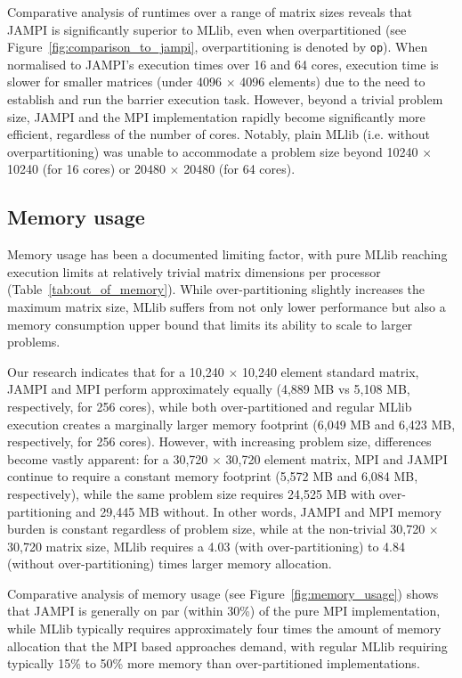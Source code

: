 \documentclass[fleqn,10pt]{SelfArx} %
\begin{document}
Comparative analysis of runtimes over a range of matrix sizes reveals that JAMPI is significantly superior to MLlib, even when overpartitioned (see Figure~\ref{fig:comparison_to_jampi}, overpartitioning is denoted by \texttt{op}). When normalised to JAMPI's execution times over 16 and 64 cores, execution time is slower for smaller matrices (under 4096 $\times$ 4096 elements) due to the need to establish and run the barrier execution task. However, beyond a trivial problem size, JAMPI and the MPI implementation rapidly become significantly more efficient, regardless of the number of cores. Notably, plain MLlib (i.e. without overpartitioning) was unable to accommodate a problem size beyond 10240 $\times$ 10240 (for 16 cores) or 20480 $\times$ 20480 (for 64 cores).

\subsection{Memory usage} %
\label{sub:memory_usage}

Memory usage has been a documented limiting factor, with pure MLlib reaching execution limits at relatively trivial matrix dimensions per processor (Table~\ref{tab:out_of_memory}). While over-partitioning slightly increases the maximum matrix size, MLlib suffers from not only lower performance but also a memory consumption upper bound that limits its ability to scale to larger problems.

Our research indicates that for a 10,240 $\times$ 10,240 element standard matrix, JAMPI and MPI perform approximately equally (4,889 MB vs 5,108 MB, respectively, for 256 cores), while both over-partitioned and regular MLlib execution creates a marginally larger memory footprint (6,049 MB and 6,423 MB, respectively, for 256 cores).  However, with increasing problem size, differences become vastly apparent: for a 30,720 $\times$ 30,720 element matrix, MPI and JAMPI continue to require a constant memory footprint (5,572 MB and 6,084 MB, respectively), while the same problem size requires 24,525 MB with over-partitioning and 29,445 MB without. In other words, JAMPI and MPI memory burden is constant regardless of problem size, while at the non-trivial 30,720 $\times$ 30,720 matrix size, MLlib requires a 4.03 (with over-partitioning) to 4.84 (without over-partitioning) times larger memory allocation.

Comparative analysis of memory usage (see Figure~\ref{fig:memory_usage}) shows that JAMPI is generally on par (within 30\%) of the pure MPI implementation, while MLlib typically requires approximately four times the amount of memory allocation that the MPI based approaches demand, with regular MLlib requiring typically 15\% to 50\% more memory than over-partitioned implementations.
\end{document}
